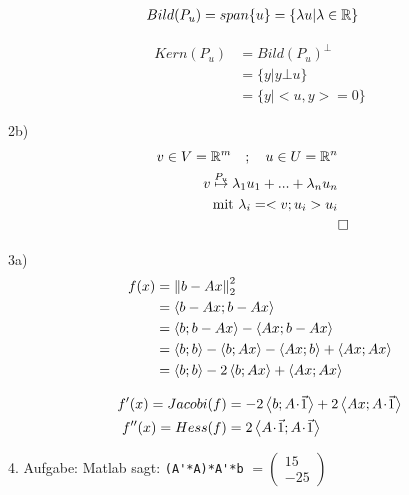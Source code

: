 \begin{equation}\begin{split}
	Bild(P_u) &= span\{u\} = \{\lambda u| \lambda \in {\mathbb R}\}
\end{split}\end{equation}

\begin{equation}\begin{split}
	Kern(P_u) &= Bild(P_u)^{\bot}\\
	&= \{y | y \bot u\}\\
	&= \{y | <u,y> = 0\}
\end{split}\end{equation}

2b)
\begin{equation}\begin{split}
	v \in V = \R^m \quad ; \quad u \in U = \R^n\\
	v \stackrel{P_u}{\mapsto} \lambda_1u_1 + ... + \lambda_nu_n \\ %
	\text{mit } \lambda_i = <v; u_i>u_i\\
	&\square
\end{split}\end{equation}

3a)
\begin{equation}\begin{split}
	f(x) &= \left\lVert b-Ax\right\rVert_2^2 \\
	&= \left\langle b-Ax;b-Ax\right\rangle  \\
	&= \left\langle b;b-Ax\right\rangle - \left\langle Ax;b-Ax\right\rangle \\
	&= \left\langle b;b\right\rangle - \left\langle b;Ax\right\rangle -\left\langle Ax;b\right\rangle + \left\langle Ax;Ax\right\rangle \\
	&= \left\langle b;b\right\rangle -2\left\langle b;Ax\right\rangle + \left\langle Ax;Ax\right\rangle \\
\end{split}\end{equation}

\begin{equation}\begin{split}
	f'(x) = Jacobi(f) &= -2\scalprod{b}{A \scdot \vec{1}}  + 2\scalprod{Ax}{A\scdot \vec{1}}\\
	f''(x) = Hess(f) &= 2\scalprod{A \scdot \vec{1}}{A \scdot \vec{1}}\\
\end{split}\end{equation}


4. Aufgabe:
Matlab sagt:
\lstinline{(A'*A)*A'*b} \quad$ = \begin{pmatrix*}15\\-25\end{pmatrix*}$


